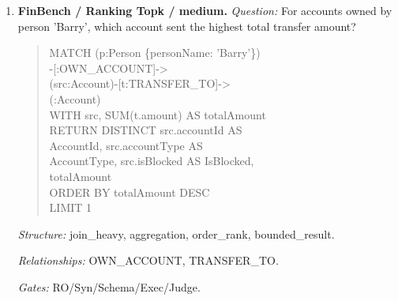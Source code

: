 \begin{enumerate}
\textit{Question:} Which accounts can receive money within two transfer hops from accounts owned by person 'Sossamon'?
\begin{quote}\scriptsize\ttfamily\raggedright\sloppy
MATCH (p:Person \{personName:\\
'Sossamon'\}) -[:OWN\_ACCOUNT]-\textgreater{}\\
(src:Account) -[:TRANSFER\_TO*1..2]-\textgreater{}\\
(dst:Account)\\
RETURN DISTINCT dst.accountId AS\\
AccountId, dst.accountType AS\\
AccountType, dst.isBlocked AS IsBlocked\\
LIMIT 300
\end{quote}
\textit{Structure:} join\_heavy, path, bounded\_result.\par
\textit{Relationships:} OWN\_ACCOUNT, TRANSFER\_TO.\par
\textit{Gates:} RO/Syn/Schema/Exec/Judge.\par
\textit{Result sample:} \{AccountId: 4687402787162554854, AccountType: credit card, IsBlocked: False\}; observed rows: 4
\item \textbf{FinBench / Ranking Topk / medium.}
\textit{Question:} For accounts owned by person 'Barry', which account sent the highest total transfer amount?
\begin{quote}\scriptsize\ttfamily\raggedright\sloppy
MATCH (p:Person \{personName: 'Barry'\})\\
-[:OWN\_ACCOUNT]-\textgreater{}\\
(src:Account)-[t:TRANSFER\_TO]-\textgreater{}\\
(:Account)\\
WITH src, SUM(t.amount) AS totalAmount\\
RETURN DISTINCT src.accountId AS\\
AccountId, src.accountType AS\\
AccountType, src.isBlocked AS IsBlocked,\\
totalAmount\\
ORDER BY totalAmount DESC\\
LIMIT 1
\end{quote}
\textit{Structure:} join\_heavy, aggregation, order\_rank, bounded\_result.\par
\textit{Relationships:} OWN\_ACCOUNT, TRANSFER\_TO.\par
\textit{Gates:} RO/Syn/Schema/Exec/Judge.\par

\end{enumerate}
